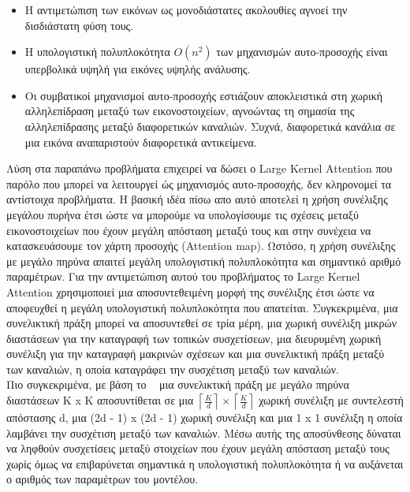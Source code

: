 \documentclass[12pt]{article}
\numberwithin{equation}{section}
\begin{document}
\begin{itemize}
    \item Η αντιμετώπιση των εικόνων ως μονοδιάστατες ακολουθίες αγνοεί την δισδιάστατη φύση τους.
    \item Η υπολογιστική πολυπλοκότητα $O(n^2)$ των μηχανισμών αυτο-προσοχής είναι υπερβολικά υψηλή για εικόνες υψηλής ανάλυσης.
    \item Οι συμβατικοί μηχανισμοί αυτο-προσοχής εστιάζουν αποκλειστικά στη χωρική αλληλεπίδραση μεταξύ των εικονοστοιχείων, αγνοώντας τη σημασία της αλληλεπίδρασης μεταξύ διαφορετικών καναλιών. Συχνά, διαφορετικά κανάλια σε μια εικόνα αναπαριστούν διαφορετικά αντικείμενα.
\end{itemize}

Λύση στα παραπάνω προβλήματα επιχειρεί να δώσει ο Large Kernel Attention που παρόλο που μπορεί να λειτουργεί ώς μηχανισμός αυτο-προσοχής, δεν κληρονομεί τα αντίστοιχα προβλήματα. Η βασική ιδέα πίσω απο αυτό αποτελεί η χρήση συνέλιξης μεγάλου πυρήνα έτσι ώστε να μπορούμε να υπολογίσουμε τις σχέσεις μεταξύ εικονοστοιχείων που έχουν μεγάλη απόσταση μεταξύ τους και στην συνέχεια να κατασκευάσουμε τον χάρτη προσοχής (Attention map). Ωστόσο, η χρήση συνέλιξης με μεγάλο πηρύνα απαιτεί μεγάλη υπολογιστική πολυπλοκότητα και σημαντικό αριθμό παραμέτρων. Για την αντιμετώπιση αυτού του προβλήματος το Large Kernel Attention χρησιμοποιεί μια αποσυντεθειμένη μορφή της συνέλιξης έτσι ώστε να αποφευχθεί η μεγάλη υπολογιστική πολυπλοκότητα που απατείται. Συγκεκριμένα, μια συνελικτική πράξη μπορεί να αποσυντεθεί σε τρία μέρη, μια χωρική συνέλιξη μικρών διαστάσεων για την καταγραφή των τοπικών συσχετίσεων, μια διευρυμένη χωρική συνέλιξη για την καταγραφή μακρινών σχέσεων και μια συνελικτική πράξη μεταξύ των καναλιών, η οποία καταγράφει την συσχέτιση μεταξύ των καναλιών. \\

\noindent Πιο συγκεκριμένα, με βάση το ~\cite{guo2022visualattentionnetwork} μια συνελικτική πράξη με μεγάλο πηρύνα διαστάσεων K x K αποσυντίθεται σε μια \(\left\lceil \frac{K}{d} \right\rceil \times \left\lceil \frac{K}{d} \right\rceil\) χωρική συνέλιξη με συντελεστή απόστασης d, μια (2d - 1) x (2d - 1) χωρική συνέλιξη και μια 1 x 1 συνέλιξη η οποία λαμβάνει την συσχέτιση μεταξύ των καναλιών. Μέσω αυτής της αποσύνθεσης δύναται να ληφθούν συσχετίσεις μεταξύ στοιχείων που έχουν μεγάλη απόσταση μεταξύ τους χωρίς όμως να επιβαρύνεται σημαντικά η υπολογιστική πολυπλοκότητα ή να αυξάνεται ο αριθμός των παραμέτρων του μοντέλου.  \\
\end{document}
